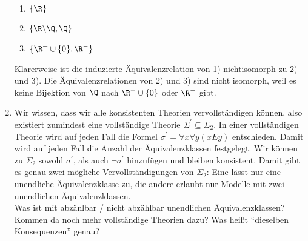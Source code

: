 \begin{solution}
\begin{enumerate}[label = \alph*.]
\begin{enumerate}[label = \arabic*)]
  \item $\{\R\}$
  \item $\{\R\backslash\Q,\Q\}$
  \item $\{\R^+\cup\{0\},\R^-\}$
\end{enumerate}
Klarerweise ist die induzierte Äquivalenzrelation von 1) nichtisomorph zu 2) und 3).
Die Äquivalenzrelationen von 2) und 3) sind nicht isomorph, weil es keine Bijektion von
$\Q$ nach $\R^+\cup\{0\}$ oder $\R^-$ gibt.
\item Wir wissen, dass wir alle konsistenten Theorien vervollständigen können,
also existiert zumindest eine vollständige Theorie $\Sigma^{\prime} \subseteq \Sigma_2$.
In einer vollständigen Theorie wird auf jeden Fall die Formel
$\sigma^{\prime} = \forall x \forall y (xEy)$ entschieden. Damit wird auf jeden Fall die Anzahl
der Äquivalenzklassen festgelegt. Wir können zu $\Sigma_2$ sowohl $\sigma^{\prime}$,
als auch $\neg \sigma^{\prime}$ hinzufügen und bleiben konsistent.
Damit gibt es genau zwei mögliche Vervollständigungen von $\Sigma_2$:
Eine lässt nur eine unendliche Äquivalenzklasse zu, die andere erlaubt nur Modelle mit
zwei unendlichen Äquivalenzklassen. \\
Was ist mit abzänlbar / nicht abzählbar unendlichen Äquivalenzklassen?
Kommen da noch mehr vollständige Theorien dazu?
Was heißt ``dieselben Konsequenzen''  genau?
\end{enumerate}

\end{solution}

